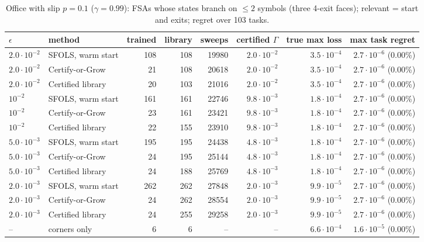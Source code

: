 \begin{table}[h]\centering\small
\caption{Office with slip $p=0.1$ ($\gamma=0.99$): FSAs whose states branch on $\le2$ symbols (three 4-exit faces); relevant = start and exits; regret over 103 tasks.}\label{tab:office1}
\begin{tabular}{llrrrrrr}
\toprule
$\epsilon$ & method & trained & library & sweeps & certified $\Gamma$ & true max loss & max task regret\\
\midrule
$2.0\cdot10^{-2}$ & SFOLS, warm start & 108 & 108 & 19980 & $2.0\cdot10^{-2}$ & $3.5\cdot10^{-4}$ & $2.7\cdot10^{-6}$ (0.00\%)\\
$2.0\cdot10^{-2}$ & Certify-or-Grow & 21 & 108 & 20618 & $2.0\cdot10^{-2}$ & $3.5\cdot10^{-4}$ & $2.7\cdot10^{-6}$ (0.00\%)\\
$2.0\cdot10^{-2}$ & Certified library & 20 & 103 & 21016 & $2.0\cdot10^{-2}$ & $3.5\cdot10^{-4}$ & $2.7\cdot10^{-6}$ (0.00\%)\\
\midrule
$10^{-2}$ & SFOLS, warm start & 161 & 161 & 22746 & $9.8\cdot10^{-3}$ & $1.8\cdot10^{-4}$ & $2.7\cdot10^{-6}$ (0.00\%)\\
$10^{-2}$ & Certify-or-Grow & 23 & 161 & 23421 & $9.8\cdot10^{-3}$ & $1.8\cdot10^{-4}$ & $2.7\cdot10^{-6}$ (0.00\%)\\
$10^{-2}$ & Certified library & 22 & 155 & 23910 & $9.8\cdot10^{-3}$ & $1.8\cdot10^{-4}$ & $2.7\cdot10^{-6}$ (0.00\%)\\
\midrule
$5.0\cdot10^{-3}$ & SFOLS, warm start & 195 & 195 & 24438 & $4.8\cdot10^{-3}$ & $1.8\cdot10^{-4}$ & $2.7\cdot10^{-6}$ (0.00\%)\\
$5.0\cdot10^{-3}$ & Certify-or-Grow & 24 & 195 & 25144 & $4.8\cdot10^{-3}$ & $1.8\cdot10^{-4}$ & $2.7\cdot10^{-6}$ (0.00\%)\\
$5.0\cdot10^{-3}$ & Certified library & 24 & 188 & 25769 & $4.8\cdot10^{-3}$ & $1.8\cdot10^{-4}$ & $2.7\cdot10^{-6}$ (0.00\%)\\
\midrule
$2.0\cdot10^{-3}$ & SFOLS, warm start & 262 & 262 & 27848 & $2.0\cdot10^{-3}$ & $9.9\cdot10^{-5}$ & $2.7\cdot10^{-6}$ (0.00\%)\\
$2.0\cdot10^{-3}$ & Certify-or-Grow & 24 & 262 & 28554 & $2.0\cdot10^{-3}$ & $9.9\cdot10^{-5}$ & $2.7\cdot10^{-6}$ (0.00\%)\\
$2.0\cdot10^{-3}$ & Certified library & 24 & 255 & 29258 & $2.0\cdot10^{-3}$ & $9.9\cdot10^{-5}$ & $2.7\cdot10^{-6}$ (0.00\%)\\
\midrule
-- & corners only & 6 & 6 & -- & -- & $6.6\cdot10^{-4}$ & $1.6\cdot10^{-5}$ (0.00\%)\\
\bottomrule
\end{tabular}
\end{table}

